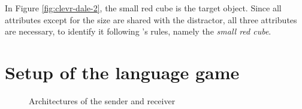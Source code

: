 \documentclass[11pt]{article}
\begin{document}
In Figure \ref*{fig:clevr-dale-2}, the small red cube is the target object. Since all attributes except for the size are shared with the distractor, all three attributes are necessary, to identify it following \citet{Dale1995}'s rules, namely the \emph{small red cube}.

\section{Setup of the language game}
\label{sec:setup-language-game}

\begin{figure}
  \centering
  \caption{Architectures of the sender and receiver}
  \label{fig:architectures}
\end{figure}
\end{document}
